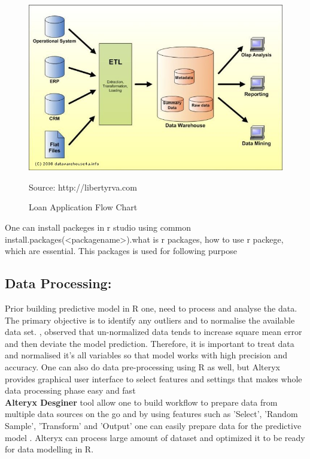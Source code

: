 \begin{figure}
\includegraphics[width=\textwidth]{dw.jpg}
\caption{Loan Application Flow Chart}{Source: http://libertyrva.com}
\end{figure}


One can install packeges in r studio using common  install.packages(<packagename>).what is r packages, how to use r packege, which are essential. This packages is used for following purpose

\subsection{Data Processing:} Prior building predictive model in R one, need to process and analyse the data. The primary objective is to identify any outliers and to normalise the available data set. \cite{sola1997importance}, observed that un-normalized data tends to increase square mean error and then deviate the model prediction. Therefore, it is important to treat data and normalised it's all variables so that model works with high precision and accuracy. One can also do data pre-processing using R as well, but Alteryx provides graphical user interface to select features and settings that makes whole data processing phase easy and fast\\

\textbf{Alteryx Desginer} tool allow one to build workflow to prepare data from multiple data sources on the go and by using features such as 'Select', 'Random Sample', 'Transform' and 'Output' one can easily prepare data for the predictive model \citep{dinsmore2016self}. Alteryx can process large amount of dataset and optimized it to be ready for data modelling in R.

